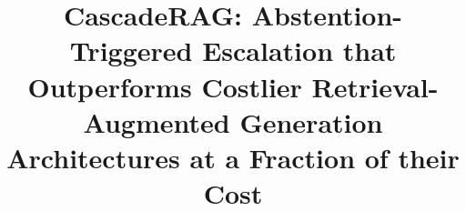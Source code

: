 \newcommand{\fitwidth}[1]{\resizebox{\ifdim\width>\textwidth\textwidth\else\width\fi}{!}{#1}}

\newenvironment{widetable}[1][t]{\begin{tableorg}[#1]\centering\small}{\end{tableorg}}

\renewcommand{\topfraction}{0.95}
\renewcommand{\floatpagefraction}{0.9}
\renewcommand{\textfraction}{0.05}
\setcounter{topnumber}{3}

\newcommand{\useresults}[1]{\IfFileExists{#1.gen.tex}{}{}}




\title[CascadeRAG: abstention-triggered escalation for retrieval-augmented generation]{CascadeRAG: Abstention-Triggered Escalation that Outperforms Costlier Retrieval-Augmented Generation Architectures at a Fraction of their Cost}

\author*[1]{ }
\author[1]{ }


